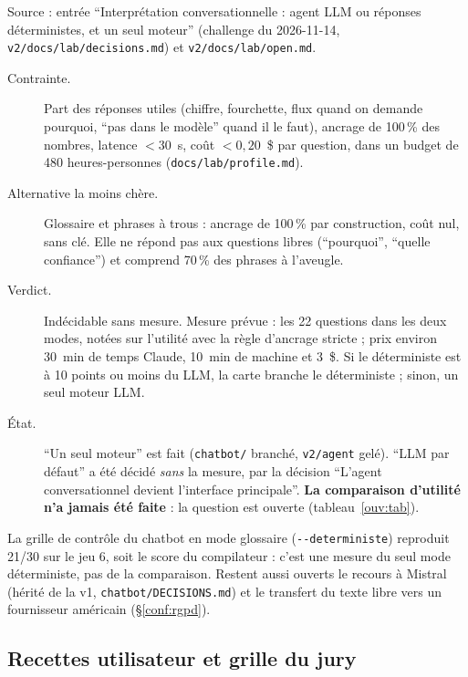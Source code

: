 Source : entrée \enquote{Interprétation conversationnelle : agent LLM ou réponses déterministes, et un seul moteur} (challenge du 2026-11-14, \texttt{v2/\allowbreak{}docs/\allowbreak{}lab/\allowbreak{}decisions.md}) et \texttt{v2/\allowbreak{}docs/\allowbreak{}lab/\allowbreak{}open.md}.

\begin{description}
\item[Contrainte.] Part des réponses utiles (chiffre, fourchette, flux quand on demande pourquoi, \enquote{pas dans le modèle} quand il le faut), ancrage de 100\suppose{}\,\% des nombres, latence $<30$\suppose{}~s, coût $<0{,}20$\suppose{}~\$ par question, dans un budget de 480\suppose{} heures-personnes (\texttt{docs/\allowbreak{}lab/\allowbreak{}profile.md}).
\item[Alternative la moins chère.] Glossaire et phrases à trous : ancrage de 100\derive{}\,\% par construction, coût nul, sans clé. Elle ne répond pas aux questions libres (\enquote{pourquoi}, \enquote{quelle confiance}) et comprend 70\mesure{}\,\% des phrases à l'aveugle.
\item[Verdict.] Indécidable sans mesure. Mesure prévue : les 22\mesure{} questions dans les deux modes, notées sur l'utilité avec la règle d'ancrage stricte ; prix environ 30\suppose{}~min de temps Claude, 10\suppose{}~min de machine et 3\suppose{}~\$. Si le déterministe est à 10\suppose{} points ou moins du LLM, la carte branche le déterministe ; sinon, un seul moteur LLM.
\item[État.] \enquote{Un seul moteur} est fait (\texttt{chatbot/\allowbreak{}} branché, \texttt{v2/\allowbreak{}agent} gelé). \enquote{LLM par défaut} a été décidé \emph{sans} la mesure, par la décision \enquote{L'agent conversationnel devient l'interface principale}. \textbf{La comparaison d'utilité n'a jamais été faite} : la question est ouverte (tableau~\ref{ouv:tab}).
\end{description}
La grille de contrôle du chatbot en mode glossaire (\texttt{-\allowbreak{}-\allowbreak{}deterministe}) reproduit 21/30\mesure{} sur le jeu 6, soit le score du compilateur : c'est une mesure du seul mode déterministe, pas de la comparaison.
Restent aussi ouverts le recours à Mistral (hérité de la v1, \texttt{chatbot/\allowbreak{}DECISIONS.md}) et le transfert du texte libre vers un fournisseur américain (§\ref{conf:rgpd}).

\subsection{Recettes utilisateur et grille du jury}\label{pro:recettes}

